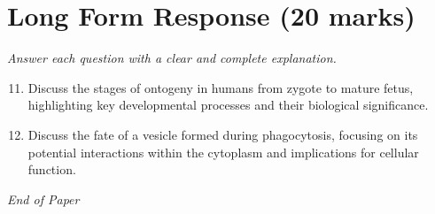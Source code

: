 \documentclass[12pt]{article}
\begin{document}
\section*{Long Form Response (20 marks)}
\textit{Answer each question with a clear and complete explanation.}
\begin{enumerate}[label=\arabic*.]
\setcounter{enumi}{10}
\item Discuss the stages of ontogeny in humans from zygote to mature fetus, highlighting key developmental processes and their biological significance.
\item Discuss the fate of a vesicle formed during phagocytosis, focusing on its potential interactions within the cytoplasm and implications for cellular function.
\end{enumerate}

\vfill
\noindent\textit{End of Paper}
\end{document}
